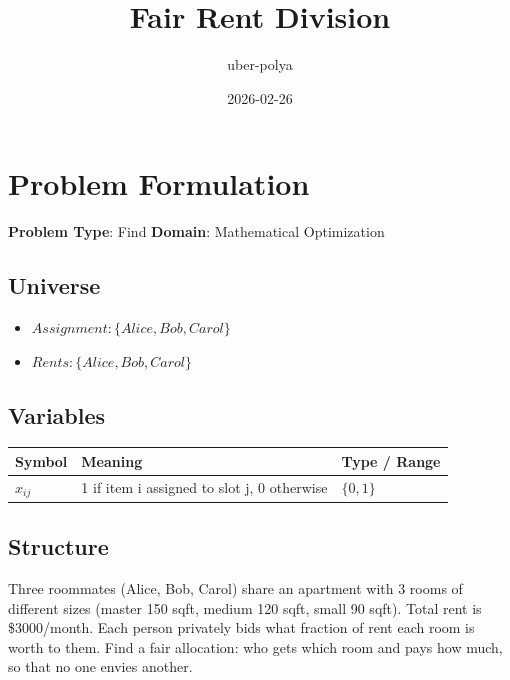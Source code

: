 \documentclass[11pt, a4paper]{article}
\title{Fair Rent Division}
\author{uber-polya}
\date{2026-02-26}
\begin{document}
\maketitle
\tableofcontents
\newpage

\section{Problem Formulation}

\begin{polyamodel}

\textbf{Problem Type}: Find \hfill
\textbf{Domain}: Mathematical Optimization


\end{polyamodel}

\subsection{Universe}

\begin{itemize}
  \item $Assignment: \{Alice, Bob, Carol\}$
  \item $Rents: \{Alice, Bob, Carol\}$
\end{itemize}

\subsection{Variables}

\begin{longtable}{lll}
\toprule
\textbf{Symbol} & \textbf{Meaning} & \textbf{Type / Range} \\
\midrule
\endhead
$x_{ij}$ & 1 if item i assigned to slot j, 0 otherwise & $\{0, 1\}$ \\
\bottomrule
\end{longtable}

\subsection{Structure}

Three roommates (Alice, Bob, Carol) share an apartment with 3 rooms of different
sizes (master 150 sqft, medium 120 sqft, small 90 sqft). Total rent is \$3000/month.
Each person privately bids what fraction of rent each room is worth to them. Find a
fair allocation: who gets which room and pays how much, so that no one envies another.
\end{document}
